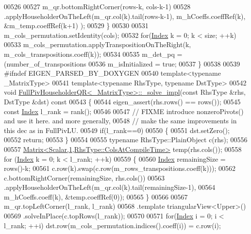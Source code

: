 \begin{DoxyCode}
00526 
00527     m\_qr.bottomRightCorner(rows-k, cols-k-1)
00528         .applyHouseholderOnTheLeft(m\_qr.col(k).tail(rows-k-1), m\_hCoeffs.coeffRef(k), &m\_temp.coeffRef(k+1)
      );
00529   \}
00530 
00531   m\_cols\_permutation.setIdentity(cols);
00532   \textcolor{keywordflow}{for}(\hyperlink{namespace_eigen_a62e77e0933482dafde8fe197d9a2cfde}{Index} k = 0; k < size; ++k)
00533     m\_cols\_permutation.applyTranspositionOnTheRight(k, m\_cols\_transpositions.coeff(k));
00534 
00535   m\_det\_pq = (number\_of\_transpositions%
00536   m\_isInitialized = \textcolor{keyword}{true};
00537 \}
00538 
00539 \textcolor{preprocessor}{#ifndef EIGEN\_PARSED\_BY\_DOXYGEN}
00540 \textcolor{keyword}{template}<\textcolor{keyword}{typename} \_MatrixType>
00541 \textcolor{keyword}{template}<\textcolor{keyword}{typename} RhsType, \textcolor{keyword}{typename} DstType>
00542 \textcolor{keywordtype}{void} \hyperlink{group___q_r___module_class_eigen_1_1_full_piv_householder_q_r}{FullPivHouseholderQR<\_MatrixType>::\_solve\_impl}(\textcolor{keyword}{const} 
      RhsType &rhs, DstType &dst)\textcolor{keyword}{ const}
00543 \textcolor{keyword}{}\{
00544   eigen\_assert(rhs.rows() == rows());
00545   \textcolor{keyword}{const} \hyperlink{namespace_eigen_a62e77e0933482dafde8fe197d9a2cfde}{Index} l\_rank = rank();
00546 
00547   \textcolor{comment}{// FIXME introduce nonzeroPivots() and use it here. and more generally,}
00548   \textcolor{comment}{// make the same improvements in this dec as in FullPivLU.}
00549   \textcolor{keywordflow}{if}(l\_rank==0)
00550   \{
00551     dst.setZero();
00552     \textcolor{keywordflow}{return};
00553   \}
00554 
00555   \textcolor{keyword}{typename} RhsType::PlainObject c(rhs);
00556 
00557   \hyperlink{group___core___module_class_eigen_1_1_matrix}{Matrix<Scalar,1,RhsType::ColsAtCompileTime>} temp(rhs.cols());
00558   \textcolor{keywordflow}{for} (\hyperlink{namespace_eigen_a62e77e0933482dafde8fe197d9a2cfde}{Index} k = 0; k < l\_rank; ++k)
00559   \{
00560     \hyperlink{namespace_eigen_a62e77e0933482dafde8fe197d9a2cfde}{Index} remainingSize = rows()-k;
00561     c.row(k).swap(c.row(m\_rows\_transpositions.coeff(k)));
00562     c.bottomRightCorner(remainingSize, rhs.cols())
00563       .applyHouseholderOnTheLeft(m\_qr.col(k).tail(remainingSize-1),
00564                                m\_hCoeffs.coeff(k), &temp.coeffRef(0));
00565   \}
00566 
00567   m\_qr.topLeftCorner(l\_rank, l\_rank)
00568       .template triangularView<Upper>()
00569       .solveInPlace(c.topRows(l\_rank));
00570 
00571   \textcolor{keywordflow}{for}(\hyperlink{namespace_eigen_a62e77e0933482dafde8fe197d9a2cfde}{Index} i = 0; i < l\_rank; ++i) dst.row(m\_cols\_permutation.indices().coeff(i)) = c.row(i);

\end{DoxyCode}
